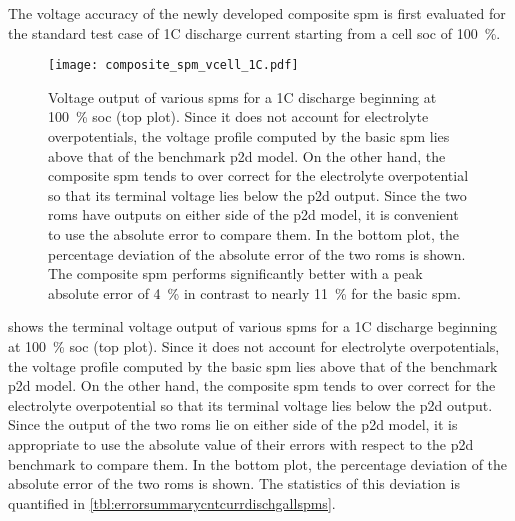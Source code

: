 The  voltage  accuracy of  the  newly  developed  composite \gls{spm}  is  first
evaluated for  the standard test  case of 1C  discharge current starting  from a
cell \gls{soc} of \SI{100}{\percent}.

\begin{figure}[!htbp]
    \centering
    \texttt{[image: composite\_spm\_vcell\_1C.pdf]}
    \caption[%
    Comparison  of  terminal  voltages  of  composite  ,  basic
     and the  model for a 1C discharge
    ]%
    {%
        Voltage output  of various \glspl{spm}  for a 1C discharge  beginning at
        \SI{100}{\percent} \gls{soc} (top  plot). Since it does  not account for
        electrolyte overpotentials,  the voltage  profile computed by  the basic
        \gls{spm} lies above that of the benchmark \gls{p2d} model. On the other
        hand, the composite \gls{spm} tends  to over correct for the electrolyte
        overpotential  so that  its terminal  voltage lies  below the  \gls{p2d}
        output. Since  the two \glspl{rom}  have outputs  on either side  of the
        \gls{p2d}  model,  it  is  convenient  to  use  the  absolute  error  to
        compare  them. In  the  bottom  plot, the  percentage  deviation of  the
        absolute error of the two  \glspl{rom} is shown. The composite \gls{spm}
        performs  significantly better  with a  peak absolute  error of  \approx
        \SI{4}{\percent} in  contrast to nearly \SI{11}{\percent}  for the basic
        \gls{spm}.
    }%
    \label{fig:voltageoutputcompareallSPMs1C}
\end{figure}

  shows the  terminal voltage  output of
various \glspl{spm} for a 1C discharge beginning at \SI{100}{\percent} \gls{soc}
(top  plot). Since  it  does  not account  for  electrolyte overpotentials,  the
voltage profile computed by the basic \gls{spm} lies above that of the benchmark
\gls{p2d}  model. On  the  other hand,  the composite  \gls{spm}  tends to  over
correct  for the  electrolyte overpotential  so that  its terminal  voltage lies
below  the \gls{p2d}  output. Since  the output  of the  two \glspl{rom}  lie on
either side of the \gls{p2d} model, it  is appropriate to use the absolute value
of their errors with respect to the  \gls{p2d} benchmark to compare them. In the
bottom  plot,  the  percentage  deviation  of the  absolute  error  of  the  two
\glspl{rom} is shown. The statistics of this deviation is quantified
in \cref{tbl:errorsummarycntcurrdischgallspms}.

